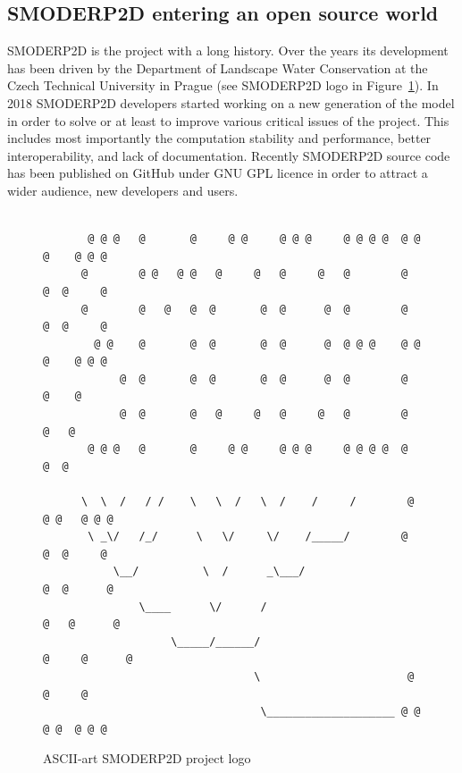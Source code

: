 \subsection{SMODERP2D entering an open source world}\label{ref:open_source_providers}

SMODERP2D is the project with a long history. Over the years its
development has been driven by the Department of Landscape Water
Conservation at the Czech Technical University in Prague (see
SMODERP2D logo in Figure~\ref{fig:smoderp2d_logo}). In 2018 SMODERP2D
developers started working on a new generation of the model in order
to solve or at least to improve various critical issues of the
project.  This includes most importantly the computation stability and
performance, better interoperability, and lack of
documentation. Recently SMODERP2D source code has been published on
GitHub \cite{smoderp2d-github-2019} under GNU GPL licence in order to
attract a wider audience, new developers and users.

\begin{figure}[ht!]
  {\tiny
\begin{verbatim}

       @ @ @   @       @     @ @     @ @ @     @ @ @ @  @ @ @    @ @ @
      @        @ @   @ @   @     @   @     @   @        @     @  @     @
      @        @   @   @  @       @  @      @  @        @     @  @     @
        @ @    @       @  @       @  @      @  @ @ @    @ @ @    @ @ @
            @  @       @  @       @  @      @  @        @   @    @
            @  @       @   @     @   @     @   @        @    @   @
       @ @ @   @       @     @ @     @ @ @     @ @ @ @  @     @  @

      \  \  /   / /    \   \  /   \  /    /     /        @ @ @   @ @ @
       \ _\/   /_/      \   \/     \/    /_____/        @     @  @     @
           \__/          \  /      _\___/                     @  @      @
               \____      \/      /                          @   @      @
                    \_____/______/                         @     @      @
                                 \                       @       @     @
                                  \____________________ @ @ @ @  @ @ @
\end{verbatim}
}
\caption{ASCII-art SMODERP2D project logo}
\label{fig:smoderp2d_logo}
\end{figure}

